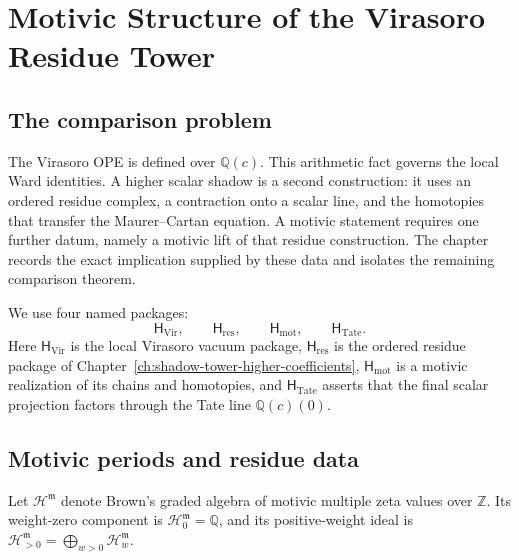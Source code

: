 
\providecommand{\MZV}{\operatorname{MZV}}
\providecommand{\mot}{\mathfrak m}
\providecommand{\Vir}{\mathrm{Vir}}
\providecommand{\cA}{\mathcal A}
\providecommand{\per}{\operatorname{per}}
\providecommand{\ClaimStatusProvedHere}{}
\providecommand{\ClaimStatusConditional}{}
\providecommand{\ClaimStatusDefinitional}{}
\providecommand{\ClaimStatusOpen}{}

\chapter{Motivic Structure of the Virasoro Residue Tower}
\label{ch:virasoro-motivic-purity-all-r-platonic}

\section*{The comparison problem}

The Virasoro OPE is defined over \(\mathbb Q(c)\).  This arithmetic
fact governs the local Ward identities.  A higher scalar shadow is a
second construction: it uses an ordered residue complex, a contraction
onto a scalar line, and the homotopies that transfer the Maurer--Cartan
equation.  A motivic statement requires one further datum, namely a
motivic lift of that residue construction.  The chapter records the
exact implication supplied by these data and isolates the remaining
comparison theorem.

We use four named packages:
\[
 \mathsf H_{\mathrm{Vir}},\qquad
 \mathsf H_{\mathrm{res}},\qquad
 \mathsf H_{\mathrm{mot}},\qquad
 \mathsf H_{\mathrm{Tate}}.
\]
Here \(\mathsf H_{\mathrm{Vir}}\) is the local Virasoro vacuum package,
\(\mathsf H_{\mathrm{res}}\) is the ordered residue package of
Chapter~\ref{ch:shadow-tower-higher-coefficients},
\(\mathsf H_{\mathrm{mot}}\) is a motivic realization of its chains and
homotopies, and \(\mathsf H_{\mathrm{Tate}}\) asserts that the final
scalar projection factors through the Tate line \(\mathbb Q(c)(0)\).

\section{Motivic periods and residue data}
\label{sec:vmpar-setup}

\begin{definition}
\label{def:vmpar-mzv-ring}
\ClaimStatusDefinitional
Let \(\mathcal H^{\mot}\) denote Brown's graded algebra of motivic
multiple zeta values over \(\mathbb Z\).  Its weight-zero component is
\(\mathcal H^{\mot}_0=\mathbb Q\), and its positive-weight ideal is
\(\mathcal H^{\mot}_{>0}=\bigoplus_{w>0}\mathcal H^{\mot}_w\).
\end{definition}

